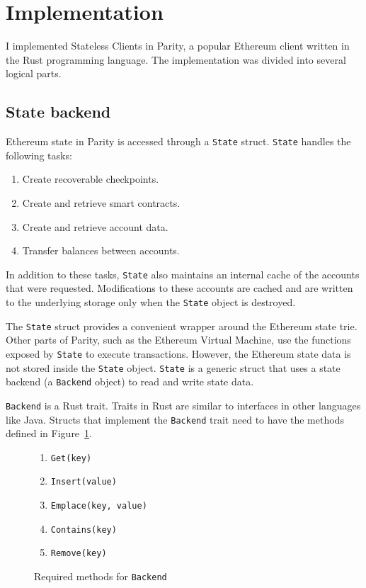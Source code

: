 \documentclass[12pt]{article}
\newcommand{\System}{Stateless Clients\xspace}
\begin{document}
\section{Implementation}

I implemented \System in Parity, a popular Ethereum client written in the Rust programming language. The implementation was divided into several logical parts.

\subsection{State backend}


Ethereum state in Parity is accessed through a \texttt{State} struct. \texttt{State} handles the following tasks:
\begin{enumerate}
  \item Create recoverable checkpoints.
  \item Create and retrieve smart contracts.
  \item Create and retrieve account data.
  \item Transfer balances between accounts.
\end{enumerate}

In addition to these tasks, \texttt{State} also maintains an internal cache of the accounts that were requested. Modifications to these accounts are cached and are written to the underlying storage only when the \texttt{State} object is destroyed.

The \texttt{State} struct provides a convenient wrapper around the Ethereum state trie. Other parts of Parity, such as the Ethereum Virtual Machine, use the functions exposed by \texttt{State} to execute transactions. However, the Ethereum state data is not stored inside the \texttt{State} object. \texttt{State} is a generic struct that uses a state backend (a \texttt{Backend} object) to read and write state data.

\texttt{Backend} is a Rust trait. Traits in Rust are similar to interfaces in other languages like Java. Structs that implement the \texttt{Backend} trait need to have the methods defined in Figure~\ref{fig:backendmethods}.

\begin{figure}[H]
  \centering
  \begin{enumerate}
    \item \texttt{Get(key)}
    \item \texttt{Insert(value)}
    \item \texttt{Emplace(key, value)}
    \item \texttt{Contains(key)}
    \item \texttt{Remove(key)}
  \end{enumerate}
  \caption{Required methods for \texttt{Backend}}
  \label{fig:backendmethods}
\end{figure}
\end{document}
